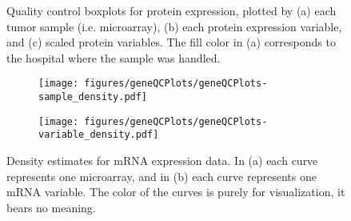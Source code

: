 \begin{figure}
	\centering
	\begin{subfigure}{1\textwidth}
		\centering
	\end{subfigure}
	\begin{subfigure}{1\textwidth}
		\centering
	\end{subfigure}
	\begin{subfigure}{1\textwidth}
		\centering
	\end{subfigure}

	\caption{Quality control boxplots for protein expression, plotted by
	(a) each tumor sample (i.e. microarray),
	(b) each protein expression variable, 
	and (c) scaled protein variables.
	The fill color in (a) corresponds to the hospital where the sample was handled.}
	\label{fig:qc-mrna-boxplot}
\end{figure}


\begin{figure}[!h]
	\centering
	\begin{subfigure}{.45\textwidth}
		\centering
		\texttt{[image: figures/geneQCPlots/geneQCPlots-sample\_density.pdf]}
	\end{subfigure}
	\begin{subfigure}{.45\textwidth}
		\centering
		\texttt{[image: figures/geneQCPlots/geneQCPlots-variable\_density.pdf]}
	\end{subfigure}

	\caption{Density estimates for mRNA expression data. In (a) each curve represents one microarray,
	and in (b) each curve represents one mRNA variable. The color of the curves is purely for visualization,
	it bears no meaning.}
	\label{fig:qc-mrna-density}
\end{figure}


